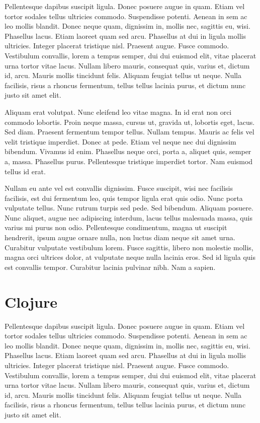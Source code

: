 Pellentesque dapibus suscipit ligula.  Donec posuere augue in quam.
Etiam vel tortor sodales tellus ultricies commodo.  Suspendisse
potenti.  Aenean in sem ac leo mollis blandit.  Donec neque quam,
dignissim in, mollis nec, sagittis eu, wisi.  Phasellus lacus.  Etiam
laoreet quam sed arcu.  Phasellus at dui in ligula mollis ultricies.
Integer placerat tristique nisl.  Praesent augue.  Fusce commodo.
Vestibulum convallis, lorem a tempus semper, dui dui euismod elit,
vitae placerat urna tortor vitae lacus.  Nullam libero mauris,
consequat quis, varius et, dictum id, arcu.  Mauris mollis tincidunt
felis.  Aliquam feugiat tellus ut neque.  Nulla facilisis, risus a
rhoncus fermentum, tellus tellus lacinia purus, et dictum nunc justo
sit amet elit.


Aliquam erat volutpat.  Nunc eleifend leo vitae magna.  In id erat non
orci commodo lobortis.  Proin neque massa, cursus ut, gravida ut,
lobortis eget, lacus.  Sed diam.  Praesent fermentum tempor tellus.
Nullam tempus.  Mauris ac felis vel velit tristique imperdiet.  Donec
at pede.  Etiam vel neque nec dui dignissim bibendum.  Vivamus id
enim.  Phasellus neque orci, porta a, aliquet quis, semper a, massa.
Phasellus purus.  Pellentesque tristique imperdiet tortor.  Nam
euismod tellus id erat.

Nullam eu ante vel est convallis dignissim.  Fusce suscipit, wisi nec
facilisis facilisis, est dui fermentum leo, quis tempor ligula erat
quis odio.  Nunc porta vulputate tellus.  Nunc rutrum turpis sed pede.
Sed bibendum.  Aliquam posuere.  Nunc aliquet, augue nec adipiscing
interdum, lacus tellus malesuada massa, quis varius mi purus non odio.
Pellentesque condimentum, magna ut suscipit hendrerit, ipsum augue
ornare nulla, non luctus diam neque sit amet urna.  Curabitur
vulputate vestibulum lorem.  Fusce sagittis, libero non molestie
mollis, magna orci ultrices dolor, at vulputate neque nulla lacinia
eros.  Sed id ligula quis est convallis tempor.  Curabitur lacinia
pulvinar nibh.  Nam a sapien.

\section{Clojure}

Pellentesque dapibus suscipit ligula.  Donec posuere augue in quam.
Etiam vel tortor sodales tellus ultricies commodo.  Suspendisse
potenti.  Aenean in sem ac leo mollis blandit.  Donec neque quam,
dignissim in, mollis nec, sagittis eu, wisi.  Phasellus lacus.  Etiam
laoreet quam sed arcu.  Phasellus at dui in ligula mollis ultricies.
Integer placerat tristique nisl.  Praesent augue.  Fusce commodo.
Vestibulum convallis, lorem a tempus semper, dui dui euismod elit,
vitae placerat urna tortor vitae lacus.  Nullam libero mauris,
consequat quis, varius et, dictum id, arcu.  Mauris mollis tincidunt
felis.  Aliquam feugiat tellus ut neque.  Nulla facilisis, risus a
rhoncus fermentum, tellus tellus lacinia purus, et dictum nunc justo
sit amet elit.

